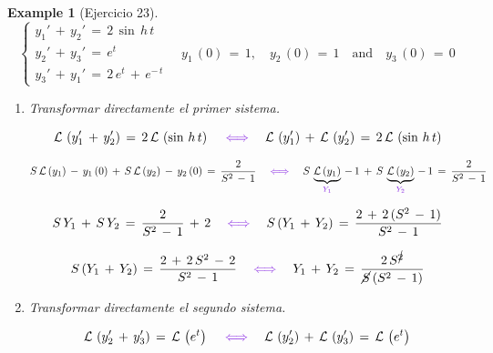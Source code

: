 \documentclass[a4paper,11pt,openany]{book}
\newtheorem{exmp}{Example}[section]
\newcommand*{\itembolasazules}[1]{%
\footnotesize\protect\tikz[baseline=-3pt]%
\protect\node[scale=.7, circle, shade, ball
color=green]{\color{white}\Large\bf#1};}
\begin{document}
\begin{exmp}[Ejercicio 23]
 
$$
\left\{
\begin{array}{lll}
y_{1}'\,+\,y_{2}'\,=\,2\,\sin\,h\,t \\
y_{2}'\,+\,y_{3}'\,=\,e^{t} \\
y_{3}'\,+\,y_{1}'\,=\,2\,e^{t}\,+\,e^{-\,t}
\end{array}
\right.
\quad y_{1}\,(0)\,=\,1, \quad  y_{2}\,(0)\,=\,1 \quad \text{and} \quad y_{3}\,(0)\,=\,0$$ 
 
\begin{enumerate}[label=\itembolasazules{\arabic*}]
 
 
\item Transformar directamente el primer sistema.
 
$$\mathcal{L}\,\left(y_{1}'\,+\,y_{2}' \right)\,=\,2\,\mathcal{L}\,\left(\sin\,h\,t \right) \quad \textcolor{blue-violet}{\iff} \quad \mathcal{L}\,\left(y_{1}' \right)\,+\,\mathcal{L}\,\left(y_{2}' \right)\,=\,2\,\mathcal{L}\,\left(\sin\,h\,t \right)$$
 
$$S\,\mathcal{L}\,(y_{1})\,-\,y_{1}\,(0)\,+\,S\,\mathcal{L}\,(y_{2})\,-\,y_{2}\,(0)\,=\,\dfrac{2}{S^{2}\,-\,1} \quad \textcolor{blue-violet}{\iff} \quad S\,\underbrace{\mathcal{L}\,(y_{1})}_{\textcolor{blue-violet}{Y_{1}} }\,-\,1\,+\,S\,\underbrace{\mathcal{L}\,(y_{2})}_{\textcolor{blue-violet}{Y_{2}}}\,-\,1\,=\,\dfrac{2}{S^{2}\,-\,1}$$
 
$$S\,Y_{1}\,+\,S\,Y_{2}\,=\,\dfrac{2}{S^{2}\,-\,1}\,+\,2 \quad \textcolor{blue-violet}{\iff} \quad S\,(Y_{1}\,+\,Y_{2})\,=\,\dfrac{2\,+\,2\,(S^{2}\,-\,1) }{S^{2}\,-\,1 }$$
 
$$S\,(Y_{1}\,+\,Y_{2})\,=\,\dfrac{2\,+\,2\,S^{2}\,-\,2 }{S^{2}\,-\,1 } \quad \textcolor{blue-violet}{\iff} \quad Y_{1}\,+\,Y_{2}\,=\,\dfrac{2\,S^{\cancel{2}}}{\cancel{S}\,(S^{2}\,-\,1)}$$
 
\begin{center}
\end{center}
 
\item Transformar directamente el segundo sistema.
 
$$\mathcal{L}\,\left(y_{2}'\,+\,y_{3}' \right)\,=\,\mathcal{L}\,\left(e^{t} \right) \quad \textcolor{blue-violet}{\iff} \quad \mathcal{L}\,\left(y_{2}' \right)\,+\,\mathcal{L}\,\left(y_{3}' \right)\,=\,\mathcal{L}\,\left(e^{t} \right)$$
 

\end{enumerate}
\end{exmp}
\end{document}
